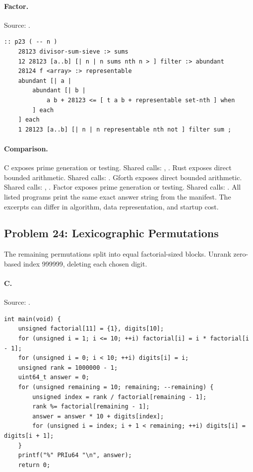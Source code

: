\paragraph{Factor.} Source: .
\begin{lstlisting}
:: p23 ( -- n )
    28123 divisor-sum-sieve :> sums
    12 28123 [a..b] [| n | n sums nth n > ] filter :> abundant
    28124 f <array> :> representable
    abundant [| a |
        abundant [| b |
            a b + 28123 <= [ t a b + representable set-nth ] when
        ] each
    ] each
    1 28123 [a..b] [| n | n representable nth not ] filter sum ;
\end{lstlisting}

\paragraph{Comparison.}
C exposes prime generation or testing. Shared calls: \texttt{}, \texttt{}. Rust exposes direct bounded arithmetic. Shared calls: \texttt{}. Gforth exposes direct bounded arithmetic. Shared calls: \texttt{}, \texttt{}. Factor exposes prime generation or testing. Shared calls: \texttt{}.
All listed programs print the same exact answer string from the manifest. The excerpts can differ in algorithm, data representation, and startup cost.

\subsection{Problem 24: Lexicographic Permutations}
\label{walkthrough:p24}
The remaining permutations split into equal factorial-sized blocks. Unrank zero-based index 999999, deleting each chosen digit.

\paragraph{C.} Source: .
\begin{lstlisting}
int main(void) {
    unsigned factorial[11] = {1}, digits[10];
    for (unsigned i = 1; i <= 10; ++i) factorial[i] = i * factorial[i - 1];
    for (unsigned i = 0; i < 10; ++i) digits[i] = i;
    unsigned rank = 1000000 - 1;
    uint64_t answer = 0;
    for (unsigned remaining = 10; remaining; --remaining) {
        unsigned index = rank / factorial[remaining - 1];
        rank %= factorial[remaining - 1];
        answer = answer * 10 + digits[index];
        for (unsigned i = index; i + 1 < remaining; ++i) digits[i] = digits[i + 1];
    }
    printf("%" PRIu64 "\n", answer);
    return 0;
\end{lstlisting}

